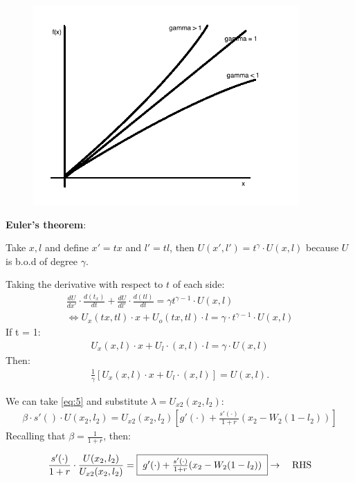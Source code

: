 \documentclass[14pt,notitlepage]{article}
\begin{document}
\begin{center}
\begin{figure}[H] 
\caption{}
\centering
\includegraphics[width=4in, height=3in]{plot13.png}
\end{figure}
\end{center}

\textbf{Euler's theorem}:

Take $x,l$ and define $x' = tx$ and $l'=tl$, then $U(x',l') = t^{\gamma}\cdot U(x,l)$ because $U$ is b.o.d of degree $\gamma$.

Taking the derivative with respect to $t$ of each side:
\begin{align*}
\frac{dU}{dx'}\cdot \frac{d(t_x)}{dt} + \frac{dU}{dl'} \cdot \frac{d(tl)}{dt} = \gamma t^{\gamma - 1} \cdot U(x,l) \\
\Leftrightarrow U_x(tx, tl) \cdot x + U_o(tx,tl)\cdot l = \gamma \cdot t^{\gamma-1} \cdot U(x,l)
\end{align*}
If t = 1:
\begin{align*}
U_x(x,l)\cdot x + U_l \cdot (x,l)\cdot l = \gamma \cdot U(x,l)
\end{align*}
Then:
\begin{align*}
\frac{1}{\gamma}[U_x(x,l)\cdot x + U_l \cdot (x,l)] = U(x,l).
\end{align*}

We can take \ref{eq:5} and substitute $\lambda = U_{x2}(x_2,l_2)$:
\begin{align*}
\beta \cdot s'() \cdot U(x_2, l_2) = U_{x2} (x_2, l_2) [g'(\cdot) + \frac{s'(\cdot)}{1+r} (x_2 - W_2(1-l_2))]
\end{align*}
Recalling that $\beta = \frac{1}{1+r}$, then:

\begin{align*}
\frac{s'(\cdot)}{1+r} \cdot \frac{U(x_2,l_2)}{U_{x2}(x_2,l_2)} = \framebox[1.1\width]{$g'(\cdot) + \frac{s'(\cdot)}{1+r} (x_2 - W_2 (1-l_2))$} \rightarrow \quad \text{RHS}
\end{align*}
\end{document}
